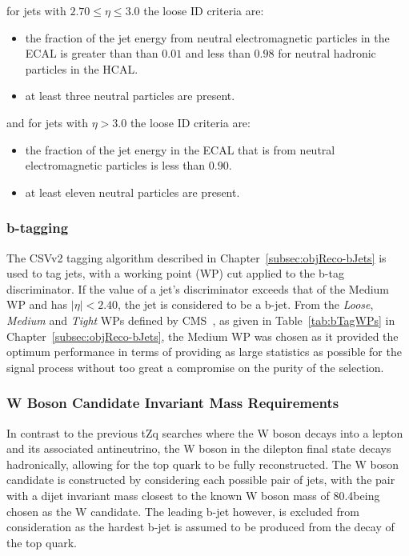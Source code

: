 for jets with $ 2.70 \leq \eta \leq 3.0$ the loose ID criteria are:
\begin{itemize}
\item the fraction of the jet energy from neutral electromagnetic particles in the ECAL is greater than than $0.01$ and less than $0.98$ for neutral hadronic particles in the HCAL.
\item at least three neutral particles are present.
\end{itemize}

and for jets with $\eta > 3.0$ the loose ID criteria are:
\begin{itemize}
\item the fraction of the jet energy in the ECAL that is from neutral electromagnetic particles is less than $0.90$.
\item at least eleven neutral particles are present.
\end{itemize}

\subsubsection{b-tagging}
The CSVv2 tagging algorithm described in Chapter~\ref{subsec:objReco-bJets} is used to tag jets, with a working point (WP) cut applied to the b-tag discriminator.
If the value of a jet's discriminator exceeds that of the Medium WP and has $|\eta| < 2.40$, the jet is considered to be a b-jet.
From the \emph{Loose}, \emph{Medium} and \emph{Tight} WPs defined by CMS~\cite{Sirunyan:2017ezt}, as given in Table~\ref{tab:bTagWPs} in Chapter~\ref{subsec:objReco-bJets}, the Medium WP was chosen as it provided the optimum performance in terms of providing as large statistics as possible for the signal process without too great a compromise on the purity of the selection.

\subsubsection{W Boson Candidate Invariant Mass Requirements}
In contrast to the previous tZq searches where the W boson decays into a lepton and its associated antineutrino, the W boson in the dilepton final state decays hadronically, allowing for the top quark to be fully reconstructed.
The W boson candidate is constructed by considering each possible pair of jets, with the pair with a dijet invariant mass closest to the known W boson mass of 80.4\GeVcc being chosen as the W candidate.
The leading b-jet however, is excluded from consideration as the hardest b-jet is assumed to be produced from the decay of the top quark. 


